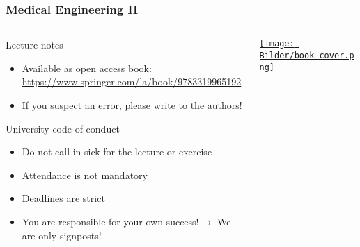 \begin{frame}
	\frametitle{Medical Engineering II}
	\begin{columns}[c, onlytextwidth]
		\begin{column}{0.6\textwidth}
			\begin{block}{Lecture notes}
				\begin{itemize}
					\item Available as open access book: \url{https://www.springer.com/la/book/9783319965192}
					\item If you suspect an error, please write to the authors!
				\end{itemize}
			\end{block}
			\begin{block}{University code of conduct}
				\begin{itemize}
					\item Do not call in sick for the lecture or exercise
					\item Attendance is not mandatory
					\item Deadlines are strict
					\item You are responsible for your own success!\newline $\rightarrow$ We are only signposts!
				\end{itemize}
			\end{block}
		\end{column}\begin{column}{0.3\textwidth}
			\href{https://www.springer.com/la/book/9783319965192}{\texttt{[image: Bilder/book\_cover.png]}}
		\end{column}
	\end{columns}
\end{frame}

